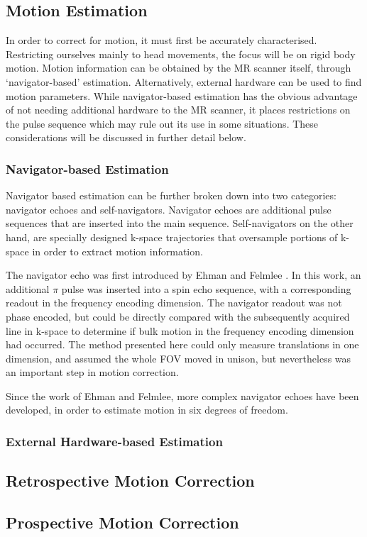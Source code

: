 \documentclass[class=article, crop=false]{standalone}
\begin{document}
	
\subsection{Motion Estimation}
In order to correct for motion, it must first be accurately characterised. Restricting ourselves mainly to head movements, the focus will be on rigid body motion. Motion information can be obtained by the MR scanner itself, through `navigator-based' estimation. Alternatively, external hardware can be used to find motion parameters. While navigator-based estimation has the obvious advantage of not needing additional hardware to the MR scanner, it places restrictions on the pulse sequence which may rule out its use in some situations. These considerations will be discussed in further detail below.

\subsubsection*{Navigator-based Estimation}
Navigator based estimation can be further broken down into two categories: navigator echoes and self-navigators. Navigator echoes are additional pulse sequences that are inserted into the main sequence. Self-navigators on the other hand, are specially designed k-space trajectories that oversample portions of k-space in order to extract motion information.
\par
The navigator echo was first introduced by Ehman and Felmlee \parencite*{Ehman1989}. In this work, an additional $\pi$ pulse was inserted into a spin echo sequence, with a corresponding readout in the frequency encoding dimension. The navigator readout was not phase encoded, but could be directly compared with the subsequently acquired line in k-space to determine if bulk motion in the frequency encoding dimension had occurred. The method presented here could only measure translations in one dimension, and assumed the whole FOV moved in unison, but nevertheless was an important step in motion correction.
\par
Since the work of Ehman and Felmlee, more complex navigator echoes have been developed, in order to estimate motion in six degrees of freedom.

\subsubsection*{External Hardware-based Estimation}

\subsection{Retrospective Motion Correction}

\subsection{Prospective Motion Correction}
\end{document}
